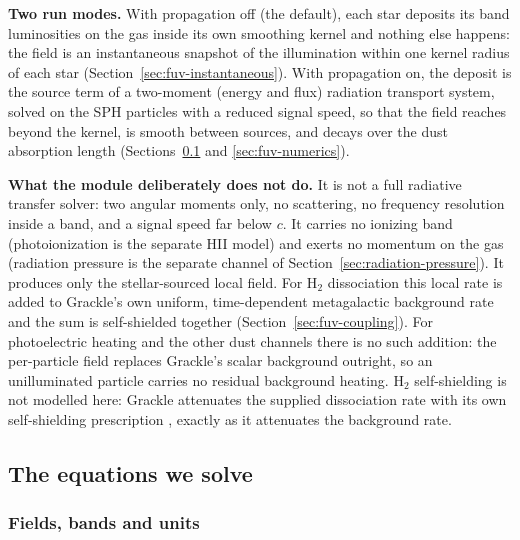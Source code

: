 \textbf{Two run modes.} With propagation off (the default), each star
deposits its band luminosities on the gas inside its own smoothing
kernel and nothing else happens: the field is an instantaneous snapshot
of the illumination within one kernel radius of each star
(Section~\ref{sec:fuv-instantaneous}). With propagation on, the deposit
is the source term of a two-moment (energy and flux) radiation transport
system, solved on the SPH particles with a reduced signal speed, so that
the field reaches beyond the kernel, is smooth between sources, and decays
over the dust absorption length (Sections~\ref{sec:fuv-equations} and
\ref{sec:fuv-numerics}).

\textbf{What the module deliberately does not do.} It is not a full
radiative transfer solver: two angular moments only, no scattering, no
frequency resolution inside a band, and a signal speed far below $c$.
It carries no ionizing band (photoionization is the separate HII model)
and exerts no momentum on the gas (radiation pressure is the separate
channel of Section~\ref{sec:radiation-pressure}). It produces only the
stellar-sourced local field. For H$_2$ dissociation this local rate is
added to Grackle's own uniform, time-dependent metagalactic background
rate and the sum is self-shielded together
(Section~\ref{sec:fuv-coupling}). For photoelectric heating and the
other dust channels there is no such addition: the per-particle field
replaces Grackle's scalar background outright, so an unilluminated
particle carries no residual background heating. H$_2$ self-shielding is
not modelled here: Grackle attenuates the supplied dissociation rate
with its own self-shielding prescription \citep{WolcottGreenHaiman2019},
exactly as it attenuates the background rate.

\subsection{The equations we solve}
\label{sec:fuv-equations}

\subsubsection{Fields, bands and units}
\label{sec:fuv-fields}

